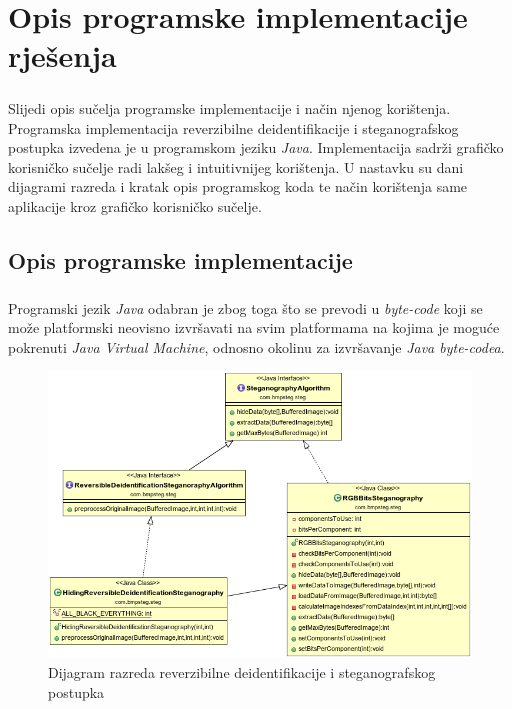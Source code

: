 \documentclass[times, utf8, seminar]{fer}
\begin{document}
\chapter{Opis programske implementacije rješenja}
\paragraph{}
Slijedi opis sučelja programske implementacije i način njenog korištenja. Programska implementacija reverzibilne deidentifikacije i steganografskog postupka izvedena je u programskom jeziku \textit{Java}. Implementacija sadrži grafičko korisničko sučelje radi lakšeg i intuitivnijeg korištenja. U nastavku su dani dijagrami razreda i kratak opis programskog koda te način korištenja same aplikacije kroz grafičko korisničko sučelje.

\section{Opis programske implementacije}
\paragraph{}
Programski jezik \textit{Java} odabran je zbog toga što se prevodi u \textit{byte-code} koji se može platformski neovisno izvršavati na svim platformama na kojima je moguće pokrenuti \textit{Java Virtual Machine}, odnosno okolinu za izvršavanje \textit{Java byte-codea}.

\begin{figure}
\caption{Dijagram razreda reverzibilne deidentifikacije i steganografskog postupka}
\label{steg_class_diagram}
\centerline{\includegraphics[scale=0.4]{images/steg_class_diagram.png}}
\end{figure}
\end{document}
